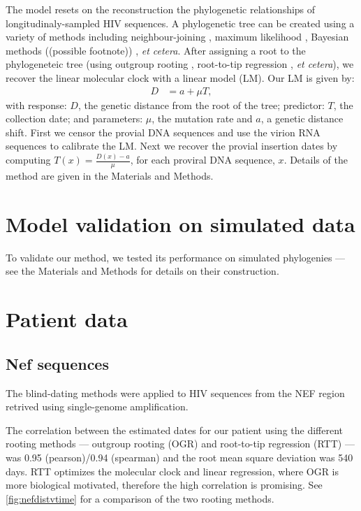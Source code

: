 \documentclass[9pt,twocolumn,twoside,lineno]{pnas-new}
\begin{document}
The model resets on the reconstruction the phylogenetic relationships of longitudinaly-sampled HIV sequences.
A phylogenetic tree can be created using a variety of methods including neighbour-joining \cite{Saitou87}, maximum likelihood \cite{fasttree,raxml}, Bayesian methods ((possible footnote)) \cite{beast}, \emph{et cetera}.
After assigning a root to the phylogeneteic tree (using outgroup rooting  \cite{Huelsenbeck02}, root-to-tip regression  \cite{Korber00}, \emph{et cetera}), we recover the linear molecular clock with a linear model (LM).
Our LM is given by:
\begin{align}
	D &= a + \mu T,\label{eq:glm}
\end{align}
with response: $D$, the genetic distance from the root of the tree; predictor: $T$, the collection date; and parameters: $\mu$, the mutation rate and $a$, a genetic distance shift.
First we censor the provial DNA sequences and use the virion RNA sequences to calibrate the LM.
Next we recover the provial insertion dates by computing $T(x) = \frac{D(x) - a}{\mu}$, for each proviral DNA sequence, $x$.
Details of the method are given in the Materials and Methods.

\section*{Model validation on simulated data}
To validate our method, we tested its performance on simulated phylogenies --- see the Materials and Methods for details on their construction.


\section*{Patient data}

\subsection*{Nef sequences}
The blind-dating methods were applied to HIV sequences from the NEF region retrived using single-genome amplification.

The correlation between the estimated dates for our patient using the different rooting methods --- outgroup rooting (OGR) and root-to-tip regression (RTT) --- was 0.95 (pearson)/0.94 (spearman) and the root mean square deviation was 540 days.
RTT optimizes the molecular clock and linear regression, where OGR is more biological motivated, therefore the high correlation is promising.
See \cref{fig:nefdistvtime} for a comparison of the two rooting methods.
\end{document}
